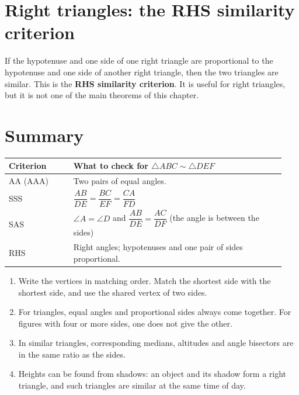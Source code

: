 \documentclass[11pt,a4paper]{article}
\theoremstyle{branddef}
\newcommand{\tr}{\triangle}
\newenvironment{steps}{\begin{enumerate}[label=\arabic*.,leftmargin=1.5em,itemsep=0pt,topsep=2pt]}{\end{enumerate}}
\begin{document}
\section{Right triangles: the RHS similarity criterion}

If the hypotenuse and one side of one right triangle are proportional to the hypotenuse and one side of another right triangle, then the two triangles are similar. This is the \textbf{RHS similarity criterion}. It is useful for right triangles, but it is not one of the main theorems of this chapter.

\section{Summary}

\begin{center}
\renewcommand{\arraystretch}{1.9}
\begin{tabular}{@{}p{0.22\linewidth}p{0.72\linewidth}@{}}
\hline
\textbf{Criterion} & \textbf{What to check for $\tr ABC\sim\tr DEF$} \\
\hline
AA (AAA) & Two pairs of equal angles. \\
SSS & $\dfrac{AB}{DE}=\dfrac{BC}{EF}=\dfrac{CA}{FD}$ \\
SAS & $\angle A=\angle D$ and $\dfrac{AB}{DE}=\dfrac{AC}{DF}$ (the angle is between the sides) \\
RHS & Right angles; hypotenuses and one pair of sides proportional. \\
\hline
\end{tabular}
\end{center}

\begin{steps}
  \item Write the vertices in matching order. Match the shortest side with the shortest side, and use the shared vertex of two sides.
  \item For triangles, equal angles and proportional sides always come together. For figures with four or more sides, one does not give the other.
  \item In similar triangles, corresponding medians, altitudes and angle bisectors are in the same ratio as the sides.
  \item Heights can be found from shadows: an object and its shadow form a right triangle, and such triangles are similar at the same time of day.
\end{steps}
\end{document}

